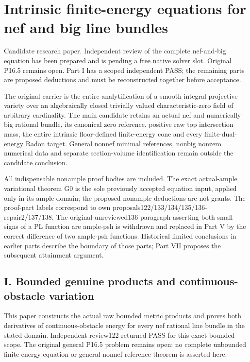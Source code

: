 \documentclass[
]{article}
\author{}
\date{}
\begin{document}
\section{Intrinsic finite-energy equations for nef and big line
bundles}\label{intrinsic-finite-energy-equations-for-nef-and-big-line-bundles}

Candidate research paper. Independent review of the complete nef-and-big
equation has been prepared and is pending a free native solver slot.
Original P16.5 remains open. Part I has a scoped independent PASS; the
remaining parts are proposed deductions and must be reconstructed
together before acceptance.

The original carrier is the entire analytification of a smooth integral
projective variety over an algebraically closed trivially valued
characteristic-zero field of arbitrary cardinality. The main candidate
retains an actual nef and numerically big rational bundle, its canonical
zero reference, positive raw top intersection mass, the entire intrinsic
floor-defined finite-energy cone and every finite-dual-energy Radon
target. General nonnef minimal references, nonbig nonzero numerical data
and separate section-volume identification remain outside the candidate
conclusion.

All indispensable nonample proof bodies are included. The exact
actual-ample variational theorem G0 is the sole previously accepted
equation input, applied only in its ample domain; the proposed nonample
deductions are not grants. The proof-part labels correspond to own
proposals122/133/134/135/136-repair2/137/138. The original unreviewed136
paragraph asserting both small signs of a PL function are ample-psh is
withdrawn and replaced in Part V by the correct difference of two
ample-psh functions. Historical limited conclusions in earlier parts
describe the boundary of those parts; Part VII proposes the subsequent
attainment argument.

\subsection{I. Bounded genuine products and continuous-obstacle
variation}\label{i.-bounded-genuine-products-and-continuous-obstacle-variation}

This paper constructs the actual raw bounded metric products and proves
both derivatives of continuous-obstacle energy for every nef rational
line bundle in the stated domain. Independent review122 returned PASS
for this exact bounded scope. The original general P16.5 problem remains
open: no complete unbounded finite-energy equation or general nonnef
reference theorem is asserted here.
\end{document}
